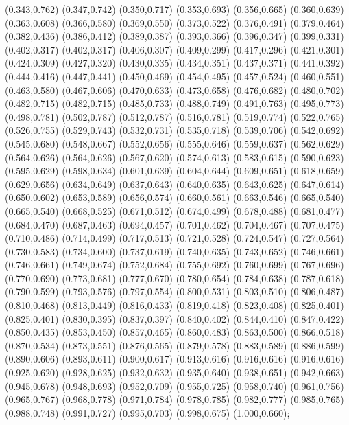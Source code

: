 {{		(0.343,0.762) (0.347,0.742) (0.350,0.717) (0.353,0.693) (0.356,0.665) (0.360,0.639)
		(0.363,0.608) (0.366,0.580) (0.369,0.550) (0.373,0.522) (0.376,0.491) (0.379,0.464)
		(0.382,0.436) (0.386,0.412) (0.389,0.387) (0.393,0.366) (0.396,0.347) (0.399,0.331)
		(0.402,0.317) (0.402,0.317) (0.406,0.307) (0.409,0.299) (0.417,0.296) (0.421,0.301)
		(0.424,0.309) (0.427,0.320) (0.430,0.335) (0.434,0.351) (0.437,0.371) (0.441,0.392)
		(0.444,0.416) (0.447,0.441) (0.450,0.469) (0.454,0.495) (0.457,0.524) (0.460,0.551)
		(0.463,0.580) (0.467,0.606) (0.470,0.633) (0.473,0.658) (0.476,0.682) (0.480,0.702)
		(0.482,0.715) (0.482,0.715) (0.485,0.733) (0.488,0.749) (0.491,0.763) (0.495,0.773)
		(0.498,0.781) (0.502,0.787) (0.512,0.787) (0.516,0.781) (0.519,0.774) (0.522,0.765)
		(0.526,0.755) (0.529,0.743) (0.532,0.731) (0.535,0.718) (0.539,0.706) (0.542,0.692)
		(0.545,0.680) (0.548,0.667) (0.552,0.656) (0.555,0.646) (0.559,0.637) (0.562,0.629)
		(0.564,0.626) (0.564,0.626) (0.567,0.620) (0.574,0.613) (0.583,0.615) (0.590,0.623)
		(0.595,0.629) (0.598,0.634) (0.601,0.639) (0.604,0.644) (0.609,0.651) (0.618,0.659)
		(0.629,0.656) (0.634,0.649) (0.637,0.643) (0.640,0.635) (0.643,0.625) (0.647,0.614)
		(0.650,0.602) (0.653,0.589) (0.656,0.574) (0.660,0.561) (0.663,0.546) (0.665,0.540)
		(0.665,0.540) (0.668,0.525) (0.671,0.512) (0.674,0.499) (0.678,0.488) (0.681,0.477)
		(0.684,0.470) (0.687,0.463) (0.694,0.457) (0.701,0.462) (0.704,0.467) (0.707,0.475)
		(0.710,0.486) (0.714,0.499) (0.717,0.513) (0.721,0.528) (0.724,0.547) (0.727,0.564)
		(0.730,0.583) (0.734,0.600) (0.737,0.619) (0.740,0.635) (0.743,0.652) (0.746,0.661)
		(0.746,0.661) (0.749,0.674) (0.752,0.684) (0.755,0.692) (0.760,0.699) (0.767,0.696)
		(0.770,0.690) (0.773,0.681) (0.777,0.670) (0.780,0.654) (0.784,0.638) (0.787,0.618)
		(0.790,0.599) (0.793,0.576) (0.797,0.554) (0.800,0.531) (0.803,0.510) (0.806,0.487)
		(0.810,0.468) (0.813,0.449) (0.816,0.433) (0.819,0.418) (0.823,0.408) (0.825,0.401)
		(0.825,0.401) (0.830,0.395) (0.837,0.397) (0.840,0.402) (0.844,0.410) (0.847,0.422)
		(0.850,0.435) (0.853,0.450) (0.857,0.465) (0.860,0.483) (0.863,0.500) (0.866,0.518)
		(0.870,0.534) (0.873,0.551) (0.876,0.565) (0.879,0.578) (0.883,0.589) (0.886,0.599)
		(0.890,0.606) (0.893,0.611) (0.900,0.617) (0.913,0.616) (0.916,0.616) (0.916,0.616)
		(0.925,0.620) (0.928,0.625) (0.932,0.632) (0.935,0.640) (0.938,0.651) (0.942,0.663)
		(0.945,0.678) (0.948,0.693) (0.952,0.709) (0.955,0.725) (0.958,0.740) (0.961,0.756)
		(0.965,0.767) (0.968,0.778) (0.971,0.784) (0.978,0.785) (0.982,0.777) (0.985,0.765)
		(0.988,0.748) (0.991,0.727) (0.995,0.703) (0.998,0.675) (1.000,0.660)};}
